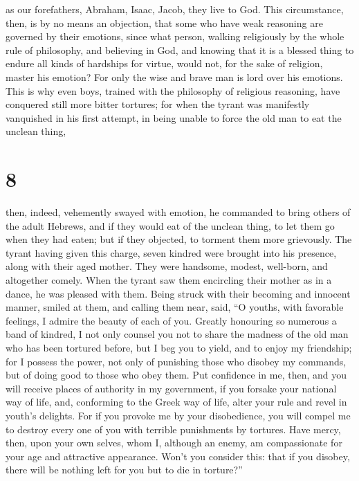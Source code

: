 as our forefathers, Abraham, Isaac, Jacob, they live to God.
 This circumstance, then, is by no means an objection, that
some who have weak reasoning are governed by their emotions,
 since what person, walking religiously by the whole rule
of philosophy, and believing in God,  and knowing that it
is a blessed thing to endure all kinds of hardships for virtue, would
not, for the sake of religion, master his emotion?  For
only the wise and brave man is lord over his emotions. 
This is why even boys, trained with the philosophy of religious
reasoning, have conquered still more bitter tortures;  for
when the tyrant was manifestly vanquished in his first attempt, in being
unable to force the old man to eat the unclean thing,

\hypertarget{section-7}{%
\section{8}\label{section-7}}

 then, indeed, vehemently swayed with emotion, he commanded
to bring others of the adult Hebrews, and if they would eat of the
unclean thing, to let them go when they had eaten; but if they objected,
to torment them more grievously.  The tyrant having given
this charge, seven kindred were brought into his presence, along with
their aged mother. They were handsome, modest, well-born, and altogether
comely.  When the tyrant saw them encircling their mother as
in a dance, he was pleased with them. Being struck with their becoming
and innocent manner, smiled at them, and calling them near, said,
 ``O youths, with favorable feelings, I admire the beauty of
each of you. Greatly honouring so numerous a band of kindred, I not only
counsel you not to share the madness of the old man who has been
tortured before,  but I beg you to yield, and to enjoy my
friendship; for I possess the power, not only of punishing those who
disobey my commands, but of doing good to those who obey them.
 Put confidence in me, then, and you will receive places of
authority in my government, if you forsake your national way of life,
 and, conforming to the Greek way of life, alter your rule
and revel in youth's delights.  For if you provoke me by
your disobedience, you will compel me to destroy every one of you with
terrible punishments by tortures.  Have mercy, then, upon
your own selves, whom I, although an enemy, am compassionate for your
age and attractive appearance.  Won't you consider this:
that if you disobey, there will be nothing left for you but to die in
torture?''

